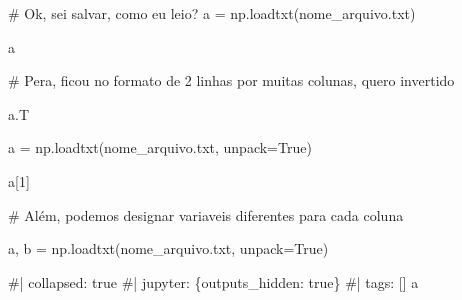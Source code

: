 \documentclass[
  letterpaper,
  DIV=11,
  numbers=noendperiod]{scrreprt}
\newenvironment{Shaded}{\begin{snugshade}}{\end{snugshade}}
\newcommand{\NormalTok}[1]{\textcolor[rgb]{0.00,0.23,0.31}{#1}}
\begin{document}
\begin{Shaded}
\begin{Highlighting}[]
\NormalTok{\# Ok, sei salvar, como eu leio?}
\NormalTok{a = np.loadtxt(\textquotesingle{}nome\_arquivo.txt\textquotesingle{})}
\end{Highlighting}
\end{Shaded}

\begin{Shaded}
\begin{Highlighting}[]
\NormalTok{a}
\end{Highlighting}
\end{Shaded}

\begin{Shaded}
\begin{Highlighting}[]
\NormalTok{\# Pera, ficou no formato de 2 linhas por muitas colunas, quero invertido}

\NormalTok{a.T}
\end{Highlighting}
\end{Shaded}

\begin{Shaded}
\begin{Highlighting}[]
\NormalTok{a = np.loadtxt(\textquotesingle{}nome\_arquivo.txt\textquotesingle{}, unpack=True)}
\end{Highlighting}
\end{Shaded}

\begin{Shaded}
\begin{Highlighting}[]
\NormalTok{a[1]}
\end{Highlighting}
\end{Shaded}

\begin{Shaded}
\begin{Highlighting}[]
\NormalTok{\# Além, podemos designar variaveis diferentes para cada coluna}

\NormalTok{a, b = np.loadtxt(\textquotesingle{}nome\_arquivo.txt\textquotesingle{}, unpack=True)}
\end{Highlighting}
\end{Shaded}

\begin{Shaded}
\begin{Highlighting}[]
\NormalTok{\#| collapsed: true}
\NormalTok{\#| jupyter: \{outputs\_hidden: true\}}
\NormalTok{\#| tags: []}
\NormalTok{a}
\end{Highlighting}
\end{Shaded}
\end{document}
